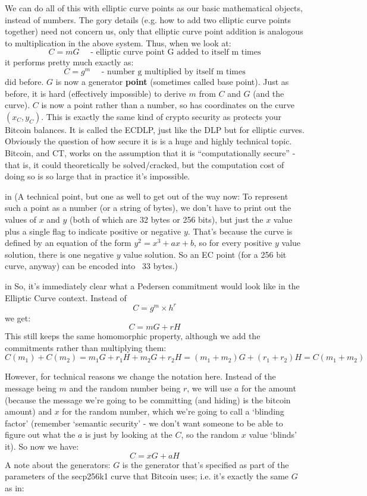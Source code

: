 \documentclass[10pt,a4paper]{article}
\begin{document}
We can do all of this with elliptic curve points as our basic mathematical objects, instead of numbers. The gory details (e.g. how to add two elliptic curve points together) need not concern us, only that elliptic curve point addition is analogous to multiplication in the above system. Thus, when we look at:
\[C = mG \quad \textrm{ - elliptic curve point G added to itself m times} \]
it performs pretty much exactly as:
\[C = g^m \quad \textrm{ - number g multiplied by itself m times} \]
did before. $G$ is now a generator \textbf{point} (sometimes called base point). Just as before, it is hard (effectively impossible) to derive $m$ from $C$ and $G$ (and the curve). $C$ is now a point rather than a number, so has coordinates on the curve $(x_C, y_C)$. This is exactly the same kind of crypto security as protects your Bitcoin balances. It is called the ECDLP, just like the DLP but for elliptic curves. Obviously the question of how secure it is is a huge and highly technical topic. Bitcoin, and CT, works on the assumption that it is ``computationally secure'' - that is, it could theoretically be solved/cracked, but the computation cost of doing so is so large that in practice it's impossible.

 in \noindent (A technical point, but one as well to get out of the way now: To represent such a point as a number (or a string of bytes), we don't have to print out the values of $x$ and $y$ (both of which are 32 bytes or 256 bits), but just the $x$ value plus a single flag to indicate positive or negative  $y$. That's because the curve is defined by an equation of the form $y^2 = x^3 + ax + b$, so for every positive $y$ value solution, there is one negative $y$ value solution. So an EC point (for a 256 bit curve, anyway) can be encoded into ~33 bytes.)

 in \noindent So, it's immediately clear what a Pedersen commitment would look like in the Elliptic Curve context. Instead of
\[C = g^m \times h^r \]
we get:
\[C = mG + rH \]
This still keeps the same homomorphic property, although we add the commitments rather than multiplying them:
\[C(m_1) + C(m_2) = m_{1}G + r_{1}H + m_{2}G +r_{2}H = (m_1+m_2)G +(r_1 + r_2)H = C(m_1+m_2) \]

However, for technical reasons we change the notation here. Instead of the message being $m$ and the random number being $r$, we will use $a$ for the amount (because the message we're going to be committing (and hiding) is the bitcoin amount) and $x$ for the random number, which we're going to call a `blinding factor' (remember `semantic security' - we don't want someone to be able to figure out what the $a$ is just by looking at the $C$, so the random $x$ value `blinds' it). So now we have:
\[C = xG + aH\]
A note about the generators: $G$ is the generator that's specified as part of the parameters of the secp256k1 curve that Bitcoin uses; i.e. it's exactly the same $G$ as in:
\end{document}
